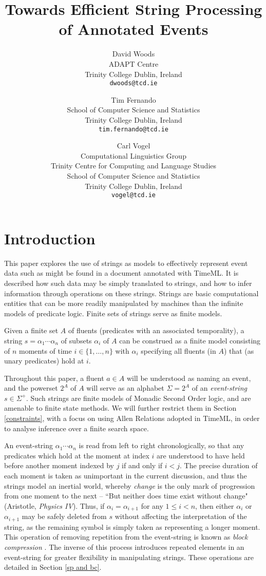 \documentclass[a4paper,11pt,leqno]{article}
\title{Towards Efficient String Processing of Annotated Events}
\date{}
\author{David Woods\\
	ADAPT Centre\\
	Trinity College Dublin, Ireland\\
	\texttt{dwoods@tcd.ie}
	\and Tim Fernando\\
	School of Computer Science and Statistics\\
	Trinity College Dublin, Ireland\\
	\texttt{tim.fernando@tcd.ie}
	\and Carl Vogel\\
	Computational Linguistics Group \\
	Trinity Centre for Computing and Language Studies\\
	School of Computer Science and Statistics\\
	Trinity College Dublin, Ireland\\
	\texttt{vogel@tcd.ie}
}
\begin{document}
\maketitle
\thispagestyle{empty}
\pagestyle{empty}
\section{Introduction}\label{intro}
This paper explores the use of strings as models to effectively represent event 
data such as might be found in a document annotated with TimeML. It is 
described how such data may be simply translated to strings, and how to infer 
information through operations on these strings. Strings are basic 
computational entities that can be more readily manipulated by machines than 
the infinite models of predicate logic. Finite sets of strings serve as finite 
models.

Given a finite set $A$ of fluents (predicates with an associated temporality), 
a string $s=\alpha_1 \cdots \alpha_n$ 
of subsets $\alpha_i$ of $A$ can be construed as a finite model 
consisting of $n$ moments of time $i \in \{1, \ldots, n\}$ with $\alpha_i$ 
specifying all fluents (in $A$) that (as unary predicates) hold at $i$.

Throughout this paper, a fluent $a \in A$ will be understood as naming 
an event, and the powerset $2^{A}$ of $A$ will serve as an alphabet $\Sigma = 
2^{A}$ of an 
\textit{event-string} $s \in \Sigma^+$. Such strings are finite models of 
Monadic Second Order logic, and are amenable to finite state methods. We will 
further restrict them in Section \ref{constraints}, with a focus on using Allen 
Relations adopted in TimeML, in order to analyse inference over a finite search 
space.

An event-string $\alpha_1 \cdots \alpha_n$ is read from left to right 
chronologically, 
so that any predicates which hold at the moment at index $i$ are understood to 
have held before another moment indexed by $j$ if and only if $i < j$. The 
precise duration of each moment is taken as unimportant in the current 
discussion, 
and thus the strings model an inertial world, whereby \textit{change} is the 
only mark of progression from one moment to the next -- ``But neither does time 
exist without change" (Aristotle, \textit{Physics IV}). Thus, if $\alpha_i = 
\alpha_{i+1}$ for any 
$1 \leq i < n$, then either $\alpha_i$ or $\alpha_{i+1}$ may be safely deleted 
from $s$ without 
affecting the interpretation of the string, as the remaining symbol is simply 
taken as representing a longer moment. This operation of removing 
repetition from 
the event-string is known as \textit{block compression} 
\citep{fernando2016prior}. The inverse of this process introduces repeated 
elements in an event-string for greater flexibility in manipulating strings. 
These operations are detailed in Section \ref{sp and bc}.
\end{document}
